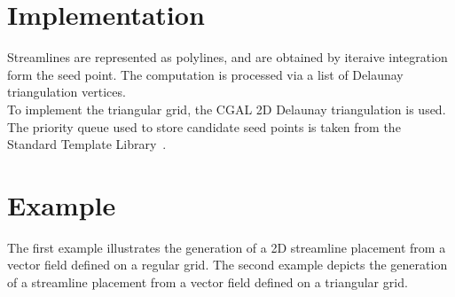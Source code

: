 \section{Implementation}
\label{Section_2D_Streamlines_Implementation}
Streamlines are represented as polylines, and are obtained by iteraive
integration form the seed point. The computation is processed via a list of
Delaunay triangulation vertices.\\To implement the triangular grid, the CGAL 2D
Delaunay triangulation is used. The priority queue used to store candidate seed
points is taken from the Standard Template Library~\cite{cgal:sgcsi-stlpg-97}.

\section{Example}
\label{Section_2D_Streamlines_Example}
The first example illustrates the generation of a 2D streamline placement from a 
vector field defined on a regular grid.
The second example depicts the generation of a streamline placement from a vector
field defined on a triangular grid.
